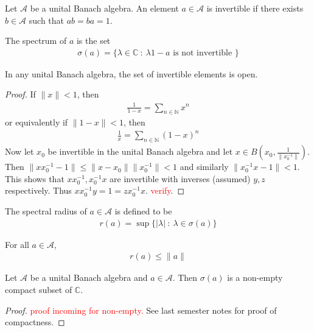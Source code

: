 \begin{definition}
  Let $\mathcal{A}$ be a  unital Banach algebra. An element $a \in
  \mathcal{A}$ is invertible if there exists $b \in \mathcal{A}$ such
  that $ab = ba = 1$.

  The spectrum of $a$ is the set
  \begin{align*}
    \sigma(a) = \{ \lambda \in \mathbb{C}  \ : \  \lambda 1 - a
    \textrm{ is not invertible } \}
  \end{align*}
\end{definition}

\begin{lemma}
  In any unital Banach algebra, the set of invertible elements is open.
\end{lemma}
\begin{proof}
  If $\|x\| < 1$, then
  \begin{align*}
    \frac{1}{1 - x} = \sum_{n \in \mathbb{N}} x^n
  \end{align*}
  or equivalently if $\|1 - x\| < 1$, then
  \begin{align*}
    \frac{1}{x} = \sum_{n \in \mathbb{N}} (1-x)^n
  \end{align*}
  Now let $x_0$ be invertible in the unital Banach algebra and let $x
  \in B(x_0, \frac{1}{\|x_0^{-1}\|})$. Then $\|xx_0^{-1}  - 1\| \le
  \|x - x_0\| \|x_0^{-1}\| < 1$ and similarly $\|x_0^{-1}x - 1\| <
  1$. This shows that $xx_0^{-1}, x_0^{-1}x$ are invertible with
  inverses (assumed) $y, z$ respectively. Thus $xx_0^{-1}y = 1 =
  zx_0^{-1}x$. \textcolor{red}{verify}.
\end{proof}

\begin{definition}
  The spectral radius of $a \in \mathcal{A}$ is defined to be
  \begin{align*}
    r(a) = \sup \{ |\lambda|  \ : \   \lambda \in \sigma(a) \}
  \end{align*}
\end{definition}

\begin{lemma} For all $a \in \mathcal{A}$,
  \begin{align*}
    r(a) \le \|a\|
  \end{align*}
\end{lemma}

\begin{theorem}
  Let $\mathcal{A}$ be a unital Banach algebra and $a \in
  \mathcal{A}$. Then $\sigma(a)$ is a non-empty compact subset of $\mathbb{C}$.
\end{theorem}
\begin{proof}
  \textcolor{red}{proof incoming for non-empty.} See last semester
  notes for proof of compactness.
\end{proof}

